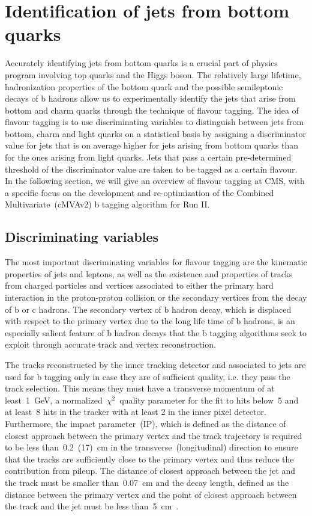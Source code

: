 \section{Identification of jets from bottom quarks}
Accurately identifying jets from bottom quarks is a crucial part of physics program involving top quarks and the Higgs boson. The relatively large lifetime, hadronization properties of the bottom quark and the possible semileptonic decays of b hadrons allow us to experimentally identify the jets that arise from bottom and charm quarks through the technique of flavour tagging. The idea of flavour tagging is to use discriminating variables to distinguish between jets from bottom, charm and light quarks on a statistical basis by assigning a discriminator value for jets that is on average higher for jets arising from bottom quarks than for the ones arising from light quarks. Jets that pass a certain pre-determined threshold of the discriminator value are taken to be tagged as a certain flavour. In the following section, we will give an overview of flavour tagging at CMS, with a specific focus on the development and re-optimization of the Combined Multivariate~(cMVAv2) b tagging algorithm for Run II.

\subsection{Discriminating variables}
The most important discriminating variables for flavour tagging are the kinematic properties of jets and leptons, as well as the existence and properties of tracks from charged particles and vertices associated to either the primary hard interaction in the proton-proton collision or the secondary vertices from the decay of b or c hadrons. The secondary vertex of b hadron decay, which is displaced with respect to the primary vertex due to the long life time of b hadrons, is an especially salient feature of b hadron decays that the b tagging algorithms seek to exploit through accurate track and vertex reconstruction. 

The tracks reconstructed by the inner tracking detector and associated to jets are used for b tagging only in case they are of sufficient quality, i.e. they pass the track selection. This means they must have a transverse momentum of at least~1~GeV, a normalized~$\chi^2$~quality parameter for the fit to hits below~5 and at least~8 hits in the tracker with at least 2 in the inner pixel detector. Furthermore, the impact parameter~(IP), which is defined as the distance of closest approach between the primary vertex and the track trajectory is required to be less than~0.2~(17)~cm in the transverse~(longitudinal) direction to ensure that the tracks are sufficiently close to the primary vertex and thus reduce the contribution from pileup. The distance of closest approach between the jet and the track must be smaller than~0.07~cm and the decay length, defined as the distance between the primary vertex and the point of closest approach between the track and the jet must be less than~5~cm~\cite{CMS-PAS-BTV-15-001}.

